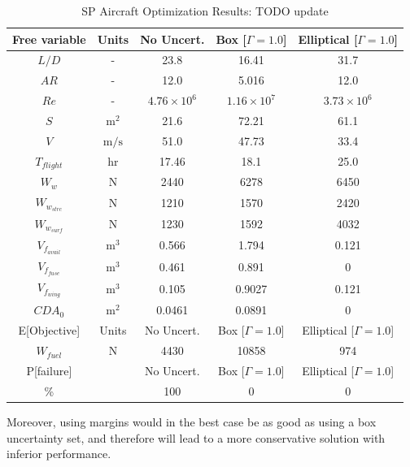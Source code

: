 \begin{table}[!h]
\begin{center}
\caption{\label{tab:results} SP Aircraft Optimization Results: TODO update}
\begin{tabular}{c c c c c}
\hline
Free variable & Units & No Uncert. & Box [$\Gamma = 1.0$] & Elliptical [$\Gamma = 1.0$] \\
\hline
$L/D$ & - & 23.8 & 16.41 & 31.7 \\
$AR$ & - & 12.0 & 5.016 & 12.0 \\
$Re$ & - & $4.76 \times 10^6$ & $1.16 \times 10^7$ & $3.73 \times 10^6$ \\
$S$ & $\mathrm{m^2}$ & 21.6 & 72.21 & 61.1 \\
$V$ & $\mathrm{m/s}$ & 51.0 & 47.73 & 33.4 \\
$T_{flight}$ & $\mathrm{hr}$ & 17.46 & 18.1 & 25.0 \\
$W_w$ & $\mathrm{N}$ & 2440 & 6278 & 6450 \\
$W_{w_{strc}}$ & $\mathrm{N}$ & 1210 & 1570 & 2420 \\
$W_{w_{surf}}$ & $\mathrm{N}$ & 1230 & 1592 & 4032 \\
$V_{f_{avail}}$ & $\mathrm{m^3}$ & 0.566 & 1.794 & 0.121 \\
$V_{f_{fuse}}$ & $\mathrm{m^3}$ & 0.461 & 0.891 & 0 \\
$V_{f_{wing}}$ & $\mathrm{m^3}$ & 0.105 & 0.9027 & 0.121 \\
$CDA_0$ & $\mathrm{m^2}$ & 0.0461 & 0.0891 & 0 \\
\hline
E[Objective] & Units & No Uncert. & Box [$\Gamma = 1.0$] & Elliptical [$\Gamma = 1.0$] \\
\hline
$W_{fuel}$ & $\mathrm{N}$ & 4430 & 10858 & 974 \\
\hline
P[failure] & & No Uncert. & Box [$\Gamma = 1.0$] & Elliptical [$\Gamma = 1.0$] \\
\hline
\% & & 100 & 0 & 0\\
\hline
\end{tabular}
\end{center}
\end{table}


Moreover, using margins would in the best case be as good as using a box uncertainty set, and therefore will lead
to a more conservative solution with inferior performance.

